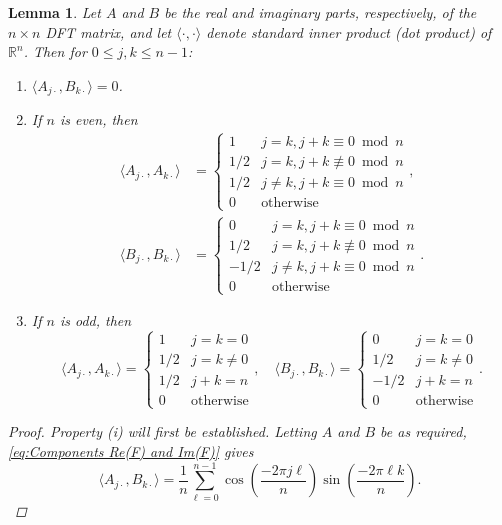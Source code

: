 \documentclass[12pt]{article}
\newtheorem{lemma}{Lemma}[section]
\begin{document}
\begin{lemma}
\label{lem:Inner products}
Let $A$ and $B$ be the real and imaginary parts, respectively, of the $n \times n$ DFT matrix, and let $\langle\cdot,\cdot\rangle$ denote standard inner product (dot product) of $\mathbb{R}^n$. Then for $0 \leq j,k \leq n-1$:
\begin{enumerate}[label=(\roman*)]
\item $\langle A_{j\cdot}, B_{k\cdot}\rangle = 0$.
\item If $n$ is even, then 
\begin{align*}
\langle A_{j\cdot}, A_{k\cdot}\rangle &= \begin{cases}
1 & j = k, j+k \equiv 0 \bmod n \\ 
1/2 & j = k, j+k \not\equiv 0 \bmod n \\ 
1/2 & j \neq k, j+k \equiv 0 \bmod n \\ 
0 & \text{otherwise} \end{cases}, \\
\langle B_{j\cdot}, B_{k\cdot}\rangle &= \begin{cases}
0 & j = k, j+k \equiv 0 \bmod n \\ 
1/2 & j = k, j+k \not\equiv 0 \bmod n \\ 
-1/2 & j \neq k, j+k \equiv 0 \bmod n \\ 
0 & \text{otherwise} \end{cases}.
\end{align*}
\item If $n$ is odd, then
\[\langle A_{j\cdot}, A_{k\cdot}\rangle = \begin{cases}
1 & j = k = 0 \\ 
1/2 & j = k \neq 0 \\
1/2 & j+k = n \\
0 & \text{otherwise} \end{cases}, \quad 
\langle B_{j\cdot}, B_{k\cdot}\rangle = \begin{cases}
0 & j = k = 0 \\ 
1/2 & j = k \neq 0 \\
-1/2 & j+k = n \\
0 & \text{otherwise} \end{cases}.\]
\end{enumerate}
\begin{proof}
Property (i) will first be established. Letting $A$ and $B$ be as required, \eqref{eq:Components Re(F) and Im(F)} gives
\begin{equation}
\langle A_{j\cdot}, B_{k\cdot}\rangle = \frac{1}{n}\sum_{\ell=0}^{n-1}\cos\left(\frac{-2\pi{j\ell}}{n}\right)\sin\left(\frac{-2\pi{\ell{k}}}{n}\right).

\end{equation}
\end{proof}
\end{lemma}
\end{document}
